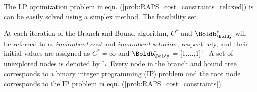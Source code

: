 The LP optimization problem in eqn. (\ref{prob:RAPS_cost_constraints_relaxed}) is can be easily solved using a simplex method. The feasibility set




At each iteration of the Branch and Bound algorithm, $C^*$ and $\Boldb_{\Boldy}^*$  will be referred to as $incumbent~cost$ and $incumbent~solution$, respectively, and their initial values are assigned as $C^* = \infty$ and $\Boldb_{\Boldy}^*$ = [1,...,1]$^\top$. 
A set of unexplored nodes is denoted by L. 
Every node in the branch and bound tree corresponds to a binary integer programming (IP) problem and the root node corresponds to the IP problem in eqn. (\ref{prob:RAPS_cost_constraints}).

